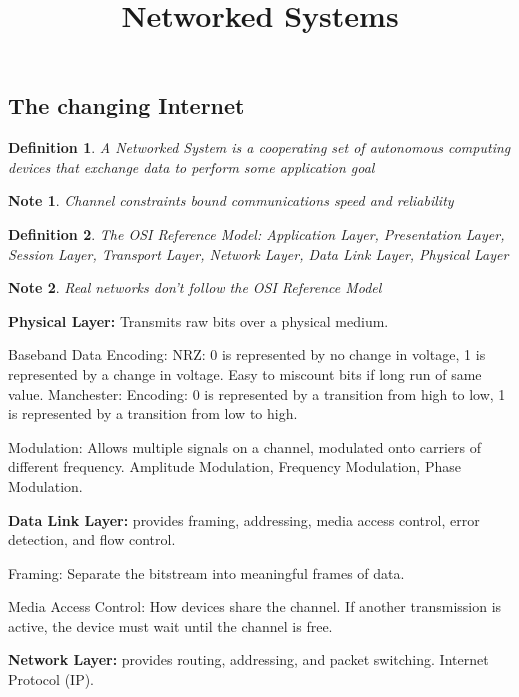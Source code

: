 \documentclass{article}
\title{Networked Systems}
\author{}
\date{}
\newtheorem{definition}{Definition}
\newtheorem{note}{Note}
\begin{document}
\footnotesize

\subsection*{The changing Internet}

\begin{definition}
    A Networked System is a cooperating set of autonomous computing devices that exchange data to perform some application goal
\end{definition}
\vspace{-15pt}
\begin{note}
    Channel constraints bound communications speed and reliability
\end{note}
\vspace{-15pt}
\begin{definition}
    The OSI Reference Model: Application Layer, Presentation Layer, Session Layer, Transport Layer, Network Layer, Data Link Layer, Physical Layer
\end{definition}
\vspace{-15pt}
\begin{note}
    Real networks don't follow the OSI Reference Model
\end{note}
\vspace{-8pt}

\noindent \textbf{Physical Layer:} Transmits raw bits over a physical medium. 

\noindent Baseband Data Encoding:
\noindent NRZ: 0 is represented by no change in voltage, 1 is represented by a change in voltage. Easy to miscount bits if long run of same value.
\noindent Manchester: Encoding: 0 is represented by a transition from high to low, 1 is represented by a transition from low to high.

\noindent Modulation: Allows multiple signals on a channel, modulated onto carriers of different frequency. Amplitude Modulation, Frequency Modulation, Phase Modulation.


\noindent \textbf{Data Link Layer:} provides framing, addressing, media access control, error detection, and flow control.

\noindent Framing: Separate the bitstream into meaningful frames of data.

\noindent Media Access Control: How devices share the channel. If another transmission is active, the device must wait until the channel is free.


\noindent \textbf{Network Layer:} provides routing, addressing, and packet switching. Internet Protocol (IP).
\end{document}
